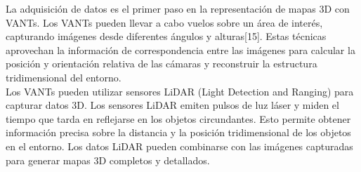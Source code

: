 \documentclass[11pt,epsf,times]{article}
\begin{document}



La adquisici\'{o}n de datos es el primer paso en la representaci\'{o}n de mapas 3D con VANTs. Los VANTs pueden llevar a cabo vuelos sobre un \'{a}rea de inter\'{e}s, capturando im\'{a}genes desde diferentes \'{a}ngulos y alturas[15]. Estas t\'{e}cnicas aprovechan la informaci\'{o}n de correspondencia entre las im\'{a}genes para calcular la posici\'{o}n y orientaci\'{o}n relativa de las c\'{a}maras y reconstruir la estructura tridimensional del entorno.\\

Los VANTs pueden utilizar sensores LiDAR (Light Detection and Ranging) para capturar datos 3D. Los sensores LiDAR emiten pulsos de luz l\'{a}ser y miden el tiempo que tarda en reflejarse en los objetos circundantes. Esto permite obtener informaci\'{o}n precisa sobre la distancia y la posici\'{o}n tridimensional de los objetos en el entorno. Los datos LiDAR pueden combinarse con las im\'{a}genes capturadas para generar mapas 3D completos y detallados.\\
\end{document}
